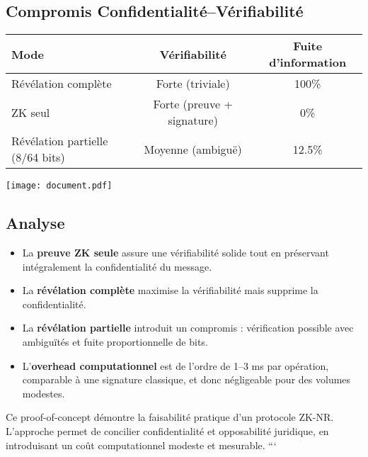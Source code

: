 \documentclass[12pt,a4paper]{article}
\begin{document}
	 \subsection{Compromis Confidentialité--Vérifiabilité}
	 \begin{center}
	 	\begin{tabular}{|l|c|c|}
	 		\hline
	 		Mode & Vérifiabilité & Fuite d'information \\
	 		\hline
	 		Révélation complète & Forte (triviale) & 100\% \\
	 		ZK seul & Forte (preuve + signature) & 0\% \\
	 		Révélation partielle (8/64 bits) & Moyenne (ambiguë) & 12.5\% \\
	 		\hline
	 	\end{tabular}
	 \end{center}
	 
	 \begin{center}
	 	\texttt{[image: document.pdf]}
	 \end{center}
	 
	 \subsection{Analyse}
	 \begin{itemize}
	 	\item La \textbf{preuve ZK seule} assure une vérifiabilité solide tout en préservant intégralement la confidentialité du message.
	 	\item La \textbf{révélation complète} maximise la vérifiabilité mais supprime la confidentialité.
	 	\item La \textbf{révélation partielle} introduit un compromis : vérification possible avec ambiguïtés et fuite proportionnelle de bits.
	 	\item L'\textbf{overhead computationnel} est de l'ordre de 1--3 ms par opération, comparable à une signature classique, et donc négligeable pour des volumes modestes.
	 \end{itemize}
	 
	 Ce proof-of-concept démontre la faisabilité pratique d'un protocole
	 ZK-NR. L'approche permet de concilier confidentialité et opposabilité
	 juridique, en introduisant un coût computationnel modeste et mesurable.
	 ```
	 
\end{document}

